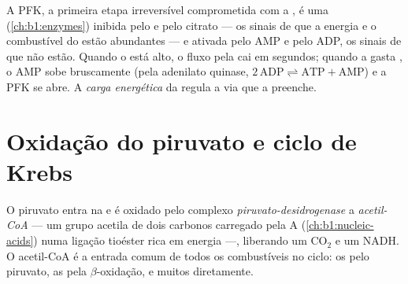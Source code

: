 \begin{proposition}\label{prop:b1:respiration-fermentation:pfk}
A PFK, a primeira etapa irreversível comprometida com a , é uma
 (\cref{ch:b1:enzymes}) inibida pelo  e pelo citrato
--- os sinais de que a energia e o combustível do  estão
abundantes --- e ativada pelo AMP e pelo ADP, os sinais de que não
estão. Quando o  está alto, o fluxo pela  cai em segundos;
quando a  gasta , o AMP sobe bruscamente (pela adenilato
quinase, $2\,\mathrm{ADP} \rightleftharpoons \mathrm{ATP} + \mathrm{AMP}$)
e a PFK se abre. A \emph{carga energética} da 
regula a via que a preenche.
\end{proposition}

\section{Oxidação do piruvato e ciclo de Krebs}

\begin{definition}\label{def:b1:respiration-fermentation:pdh}
O piruvato entra na  e é oxidado pelo complexo
\emph{piruvato-desidrogenase} a \emph{acetil-CoA} ---
um grupo acetila de dois carbonos carregado pela  A
(\cref{ch:b1:nucleic-acids}) numa ligação tioéster rica em energia ---,
liberando um $\mathrm{CO_2}$ e um NADH. O acetil-CoA é a entrada comum
de todos os combustíveis no ciclo: os  pelo piruvato, as
 pela $\beta$-oxidação, e muitos  diretamente.
\end{definition}

